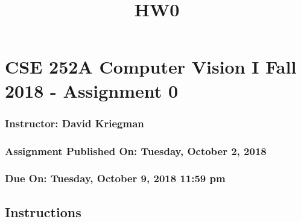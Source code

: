 \documentclass[11pt]{article}
\title{HW0}
\begin{document}
    
    
    \maketitle
    
    

    
    \section{CSE 252A Computer Vision I Fall 2018 - Assignment
0}\label{cse-252a-computer-vision-i-fall-2018---assignment-0}

\subsubsection{Instructor: David
Kriegman}\label{instructor-david-kriegman}

\subsubsection{Assignment Published On: Tuesday, October 2,
2018}\label{assignment-published-on-tuesday-october-2-2018}

\subsubsection{Due On: Tuesday, October 9, 2018 11:59
pm}\label{due-on-tuesday-october-9-2018-1159-pm}

\subsection{Instructions}\label{instructions}
\end{document}
